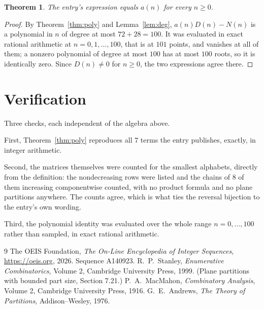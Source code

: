 \documentclass[11pt,a4paper]{article}
\theoremstyle{plain}
\newtheorem{theorem}{Theorem}
\theoremstyle{definition}
\begin{document}
\begin{theorem}
The entry's expression equals $a(n)$ for every $n\ge0$.
\end{theorem}

\begin{proof}
By Theorem~\ref{thm:poly} and Lemma~\ref{lem:deg}, $a(n)D(n)-N(n)$ is a polynomial in $n$
of degree at most $72+28=100$. It was evaluated in exact rational arithmetic at
$n=0,1,\dots,100$, that is at $101$ points, and vanishes at all of them; a nonzero polynomial
of degree at most $100$ has at most $100$ roots, so it is identically zero. Since $D(n)\neq0$
for $n\ge0$, the two expressions agree there.
\end{proof}

\section{Verification}

Three checks, each independent of the algebra above.

First, Theorem~\ref{thm:poly} reproduces all $7$ terms the entry publishes,
exactly, in integer arithmetic.

Second, the matrices themselves were counted for the smallest alphabets, directly from the
definition: the nondecreasing rows were listed and the chains of $8$ of them increasing
componentwise counted, with no product formula and no plane partitions anywhere. The counts
agree, which is what ties the reversal bijection to the entry's own wording.

Third, the polynomial identity was evaluated over the whole range $n=0,\dots,100$ rather than
sampled, in exact rational arithmetic.

\begin{thebibliography}{9}
 The OEIS Foundation, \emph{The On-Line Encyclopedia of Integer
Sequences}, \url{https://oeis.org}, 2026. Sequence A140923.
 R.~P.~Stanley, \emph{Enumerative Combinatorics}, Volume 2, Cambridge
University Press, 1999. (Plane partitions with bounded part size, Section 7.21.)
 P.~A.~MacMahon, \emph{Combinatory Analysis}, Volume 2, Cambridge
University Press, 1916.
 G.~E.~Andrews, \emph{The Theory of Partitions}, Addison--Wesley, 1976.
\end{thebibliography}
\end{document}
